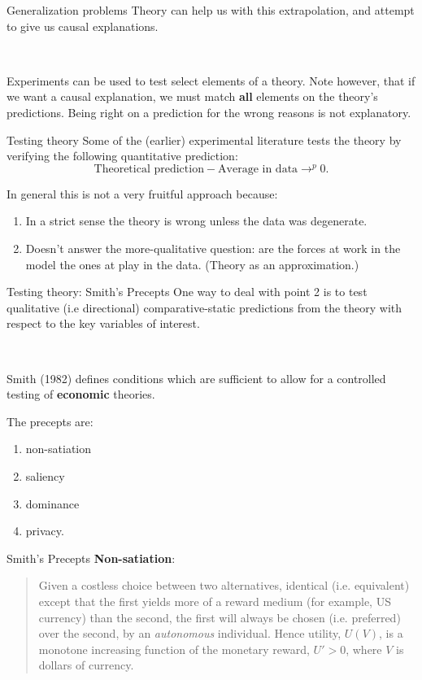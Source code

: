 \documentclass{beamer}
\begin{document}
\begin{frame}{Generalization problems}
Theory can help us with this extrapolation, and attempt to give us causal explanations.

\

Experiments can be used to test select elements of a theory. Note however, that if we want a causal explanation, we must match \textbf{all} elements on the theory's predictions. Being right on a prediction for the wrong reasons is not explanatory.
\end{frame}

\begin{frame}{Testing theory}
Some of the (earlier) experimental literature tests the theory by verifying
the following quantitative prediction:
$$\text{Theoretical prediction}-\text{Average in data}\longrightarrow^p 0.$$

\pause
In general this is not a very fruitful approach because:
	\begin{enumerate}
		\item In a strict sense the theory is wrong unless the data was degenerate.
		\item Doesn't answer the more-qualitative question: are the forces at work in the model the
		ones at play in the data. (Theory as an approximation.)
	\end{enumerate}
\end{frame}

\begin{frame}{Testing theory: Smith's Precepts}
One way to deal with point 2 is to test qualitative (i.e directional) comparative-static predictions from the
theory with respect to the key variables of interest.

\

Smith (1982) defines conditions which are sufficient to allow for a
controlled testing of \textbf{economic} theories. \pause

The precepts are:
\begin{enumerate}
\item non-satiation
\item saliency
\item dominance
\item privacy.
\end{enumerate}
\end{frame}

\begin{frame}{Smith's Precepts}
\textbf{Non-satiation}:
\begin{quotation}
Given a costless choice between two alternatives, identical (i.e. equivalent) except that the first yields more of a reward medium (for example, US currency) than the second, the first will always be chosen (i.e. preferred) over the second, by an \emph{autonomous} individual. Hence utility, $U(V)$, is a monotone increasing function of the monetary reward, $U'>0$, where $V$ is dollars of currency.
\end{quotation}
\end{frame}
\end{document}
